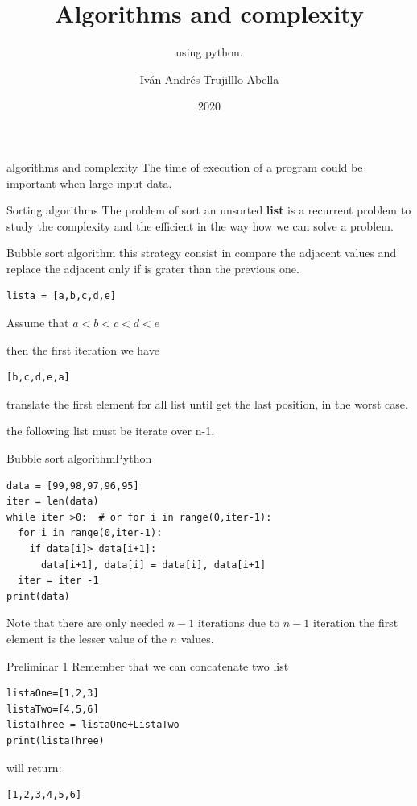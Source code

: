 \documentclass{beamer}
\institute{Javeriana}
\date{2020}
\title[Pontificia Universidad Javeriana] %
{Algorithms and complexity \textbf{}}
\subtitle{using python.}
\author[Iván Andrés Trujillo Abella] 
{Iván Andrés Trujilllo Abella}
\institute[] 
{
  Facultad de Ingenieria\\
  Pontificia Universidad Javeriana
  \and
  
\textbf{ trujilloiv@javeriana.edu.co}
}
\date[MINTA] %
\begin{document}
\frame{\titlepage}

\begin{frame}{algorithms and complexity}
The time of execution of a program could be important when large input data.
\end{frame}

\begin{frame}[fragile]{Sorting algorithms}
The problem of sort an unsorted \textbf{list} is a recurrent problem to study the complexity and the efficient in the way how we can solve a problem.
\end{frame}

\begin{frame}[fragile]{Bubble sort algorithm}
this strategy consist in compare the adjacent values and replace the adjacent only if is grater than the previous one.


\begin{lstlisting}
lista = [a,b,c,d,e]
\end{lstlisting}
Assume that  $ a < b < c < d <e$ 

then the first iteration we have 
\begin{verbatim}
[b,c,d,e,a]
\end{verbatim}
translate the first  element for all list until get the last position, in the worst case.

the following list must be iterate over n-1. 

\end{frame}

\begin{frame}[fragile]{Bubble sort algorithm}{Python}
\begin{lstlisting}
data = [99,98,97,96,95]
iter = len(data)
while iter >0:  # or for i in range(0,iter-1):
  for i in range(0,iter-1):
    if data[i]> data[i+1]:
      data[i+1], data[i] = data[i], data[i+1]
  iter = iter -1 
print(data)
\end{lstlisting}
Note that there are only needed $n-1$ iterations due to $n-1$ iteration the first element is the lesser value of the $n$ values.
\end{frame}


\begin{frame}[fragile]{Preliminar 1}
Remember that we can concatenate two list 
\begin{lstlisting}
listaOne=[1,2,3]
listaTwo=[4,5,6]
listaThree = listaOne+ListaTwo
print(listaThree)
\end{lstlisting}
will return:
\begin{verbatim}
[1,2,3,4,5,6]
\end{verbatim}
\end{frame}
\end{document}
